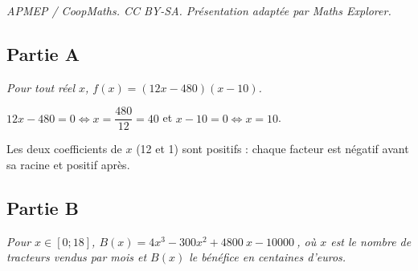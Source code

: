 \documentclass[10pt]{article}
\providecommand{\np}[2][]{{#2~#1}}
\begin{document}
\noindent\textit{APMEP / CoopMaths. CC BY-SA. Présentation adaptée par Maths Explorer.}\par\medskip
\subsection*{Partie A}

\emph{Pour tout réel $x$, $f(x) = (12x - 480)(x - 10)$.}

$12x - 480 = 0 \iff x = \dfrac{480}{12} = 40$ \quad et \quad $x - 10 = 0 \iff x = 10$.

Les deux coefficients de $x$ (12 et 1) sont positifs : chaque
facteur est négatif avant sa racine et positif après.

\begin{center}
\end{center}


\subsection*{Partie B}

\emph{Pour $x \in [0 ; 18]$, $B(x) = 4x^3 - 300x^2 + \np{4800}x - \np{10000}$, où $x$ est le nombre de
tracteurs vendus par mois et $B(x)$ le bénéfice en centaines d'euros.}
\end{document}
